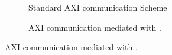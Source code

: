 %  

\begin{figure}
    \centering
    \begin{subfigure}{0.49\textwidth}
      \centering
      
      \caption{Standard AXI communication Scheme}
      \label{fig:axi_transaction_scheme_figure}
  \end{subfigure}
  \hfill
  \begin{subfigure}{0.49\textwidth}
      \centering
      
      \caption{AXI communication mediated with \schim.}
      \label{fig:SchIM_transaction_scheme_figure}
  \end{subfigure}
\end{figure}
